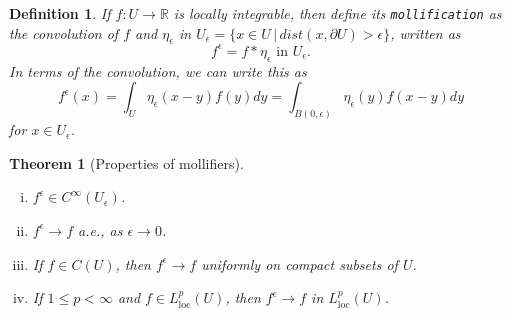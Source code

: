 \documentclass[11pt]{article}
\newtheorem{theorem}{Theorem}
\newtheorem{definition}{Definition}
\theoremstyle{definition}
\begin{document}
\begin{definition}
	If $f : U \rightarrow \mathbb{R}$ is locally integrable, then define its \texttt{mollification} as
	the convolution of $f$ and $\eta_{\epsilon}$ in $U_{\epsilon} = \{x\in U \,|\, dist(x,\partial U) > \epsilon \}$, written as
	\begin{equation*}
		f^{\epsilon} = f * \eta_{\epsilon} \text{ in } U_{\epsilon}.
	\end{equation*}
	In terms of the convolution, we can write this as
	\begin{equation*}
		f^{\epsilon}(x) = \int_U \eta_{\epsilon}(x-y)f(y)dy = \int_{B(0,\epsilon)} \eta_{\epsilon}(y)f(x-y)dy
	\end{equation*}
	for $x \in U_{\epsilon}$.
\end{definition}
\begin{theorem}[Properties of mollifiers]~ 
	\begin{enumerate}[(i)]
		\item $f^{\epsilon} \in C^{\infty}(U_{\epsilon})$.
		\item $f^{\epsilon} \rightarrow f$ a.e., as $\epsilon \rightarrow 0$.
		\item If $f \in C(U)$, then $f^{\epsilon} \rightarrow f$ uniformly on compact subsets of $U$.
		\item If $1\leq p < \infty$ and $f \in L_{\text{loc}}^p(U)$, then $f^{\epsilon} \rightarrow f$ in $L_{\text{loc}}^p(U)$.
	\end{enumerate}
\end{theorem}

\newpage
\end{document}
